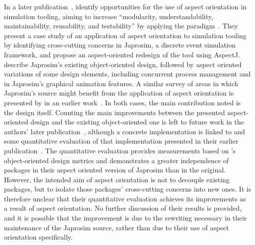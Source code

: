  In a later publication~\cite{chibani2019using}, \citeauthor{chibani2019using}
identify opportunities for the use of aspect orientation in simulation tooling,
aiming to increase ``modularity, understandability, maintainability,
reusability, and testability'' by applying the paradigm~\cite{chibani2019using}.
They present a case study of an application of aspect orientation to simulation
tooling by identifying cross-cutting concerns in Japrosim, a discrete event
simulation framework, and propose an aspect-oriented redesign of the tool using
AspectJ. \citeauthor{chibani2019using} describe Japrosim's existing
object-oriented design, followed by aspect oriented variations of some design
elements, including concurrent process management and in Japrosim's graphical
animation features. A similar survey of areas in which Japrosim's source might
benefit from the application of aspect orientation is presented by
\citeauthor{chibani2014practical} in an earlier
work~\cite{chibani2014practical}. In both cases, the main contribution noted is
the design itself. Counting the main improvements between the presented
aspect-oriented design and the existing object-oriented one is left to future
work %
in the authors' later publication~\cite{chibani2019using}, although a
concrete implementation is linked to and some quantitative evaluation of that
implementation presented in their earlier
publication~\cite{chibani2014practical}. The quantitative evaluation provides
measurements based on \citeauthor{martin1994oo}'s object-oriented design metrics
and demonstrates a greater independence of packages in their aspect oriented
version of Japrosim than in the original. However, the intended aim of aspect
orientation is not to decouple existing packages, but to isolate those packages'
cross-cutting concerns into new ones. It is therefore unclear that their
quantitative evaluation achieves its improvements as a result of aspect
orientation. No further discussion of their results is provided, and it is
possible that the improvement is due to the rewriting necessary in their
maintenance of the Japrosim source, rather than due to their use of aspect
orientation specifically.

